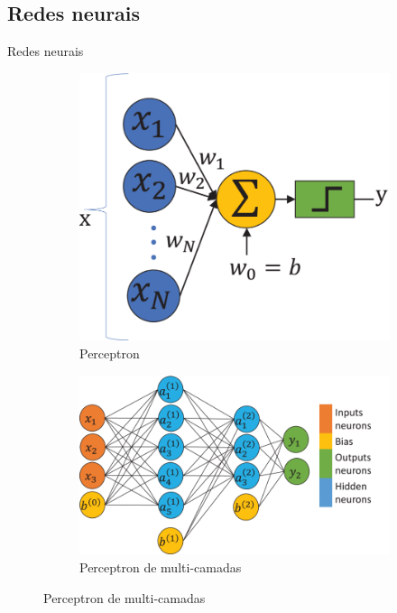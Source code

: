 \subsection{Redes neurais}
\begin{frame}{Redes neurais}
	\begin{figure}
		\centering
		\caption{Arquiteturas do Perceptron}
		\label{fig:perceptrons}
		\begin{subfigure}[b]{0.3\textwidth}
			\caption{Perceptron}
			\label{fig:perceptron}
			\includegraphics[width=\textwidth]{figs/perceptron}
		\end{subfigure}
		\qquad\qquad
		\begin{subfigure}[b]{0.3\textwidth}
			\caption{Perceptron de multi-camadas}
			\label{fig:mlp}
			\includegraphics[width=\textwidth]{figs/mlp}

\end{subfigure}
\end{figure}
\end{frame}
